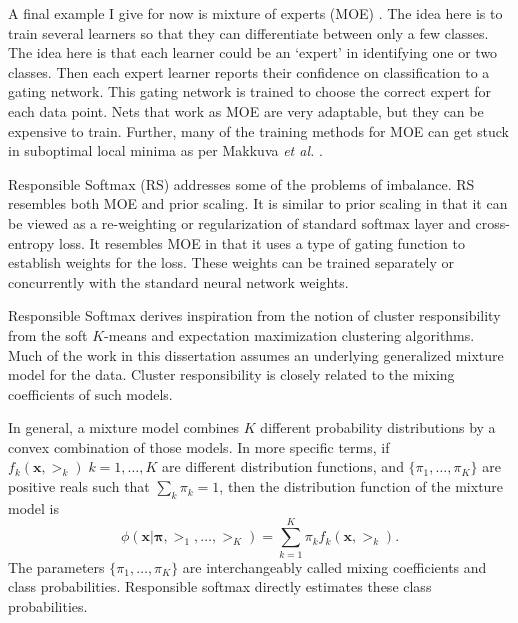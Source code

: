 A final example I give for now is mixture of experts (MOE) \cite{MOEJacobs}. The idea here is to train several learners so that they can differentiate between only a few classes.  The idea here is that each learner could be an `expert' in identifying one or two classes.  Then each expert learner reports their confidence on classification to a gating network.  This gating network is trained to choose the correct expert for each data point. Nets that work as MOE are very adaptable, but they can be expensive to train.  Further, many of the training methods for MOE can get stuck in suboptimal local minima as per Makkuva \textit{et al.} \cite{MOEGridlock}.

Responsible Softmax (RS) addresses some of the problems of imbalance. RS resembles both MOE and prior scaling.  It is similar to prior scaling in that it can be viewed as a re-weighting or regularization of standard softmax layer and cross-entropy loss. It resembles MOE in that it uses a type of gating function to establish weights for the loss. These weights can be trained separately or concurrently with the standard neural network weights.

Responsible Softmax derives inspiration from the notion of cluster responsibility from the soft \(K\)-means \citep[ch.20-22]{MacKay2002} and expectation maximization \cite{Dempster77EM,NealHintonEM1999} clustering algorithms.  Much of the work in this dissertation assumes an underlying generalized mixture model for the data. Cluster responsibility is closely related to the mixing coefficients of such models. 

In general, a mixture model combines \( K \) different probability distributions by a convex combination of those models.  In more specific terms, if \( f_k(\bm x,\bm\gt_k)\; k=1,\ldots,K \) are different distribution functions, and \( \{\pi_1,\ldots,\pi_K\} \) are positive reals such that \( \sum_k \pi_k =1 \), then the distribution function of the mixture model is 
\begin{equation}\label{eqn:mixtureDist}
\phi(\bm x|\bm\pi,\bm\gt_1,\ldots,\bm\gt_K) = \sum_{k=1}^{K} \pi_kf_k(\bm x,\bm\gt_k).
\end{equation}
The parameters \( \{\pi_1,\ldots,\pi_K\} \) are interchangeably called mixing coefficients and class probabilities.  Responsible softmax directly estimates these class probabilities.

